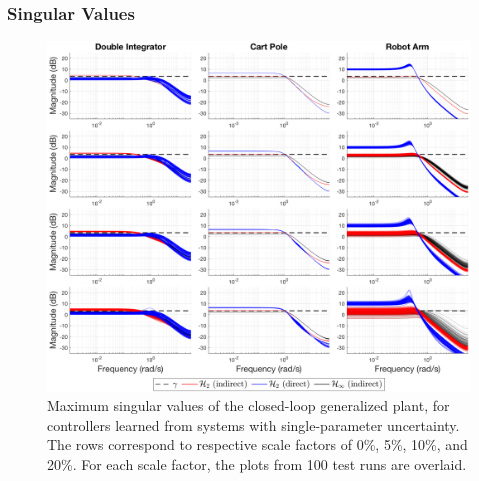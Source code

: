 \subsubsection{Singular Values}
\begin{figure}[H]
\centering
	\includegraphics[width=\textwidth]{figures/uncertainty_singular_values4_s.png}
\caption{Maximum singular values of the closed-loop generalized plant, for controllers learned from systems with single-parameter uncertainty.  The rows correspond to respective scale factors of 0\%, 5\%, 10\%, and 20\%.  For each scale factor, the plots from 100 test runs are overlaid.}
\label{fig:uncertainty_singular_values4_s}
\end{figure}

\newpage
